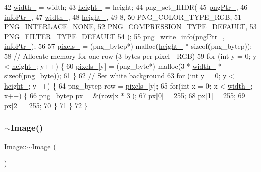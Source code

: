\begin{DoxyCode}
42     \mbox{\hyperlink{class_image_a4c2d8a01ecf1b7438f57f93357080e08}{width\_}} = width;
43     \mbox{\hyperlink{class_image_a64a699c5bb8e8a18c6971a8032806dba}{height\_}} = height;
44     png\_set\_IHDR(
45         \mbox{\hyperlink{class_image_aaf607d2596bac09b13370599d9ba6d8c}{pngPtr\_}}, 
46         \mbox{\hyperlink{class_image_a505878e5e19500e3cc1b940067faa584}{infoPtr\_}}, 
47         \mbox{\hyperlink{class_image_a4c2d8a01ecf1b7438f57f93357080e08}{width\_}}, 
48         \mbox{\hyperlink{class_image_a64a699c5bb8e8a18c6971a8032806dba}{height\_}}, 
49         8, 
50         PNG\_COLOR\_TYPE\_RGB, 
51         PNG\_INTERLACE\_NONE, 
52         PNG\_COMPRESSION\_TYPE\_DEFAULT, 
53         PNG\_FILTER\_TYPE\_DEFAULT
54     );
55     png\_write\_info(\mbox{\hyperlink{class_image_aaf607d2596bac09b13370599d9ba6d8c}{pngPtr\_}}, \mbox{\hyperlink{class_image_a505878e5e19500e3cc1b940067faa584}{infoPtr\_}});
56     
57     \mbox{\hyperlink{class_image_a51351c8507499d09cb9667c20ef01faf}{pixels\_}} = (png\_bytep*) malloc(\mbox{\hyperlink{class_image_a64a699c5bb8e8a18c6971a8032806dba}{height\_}} * \textcolor{keyword}{sizeof}(png\_bytep));
58     \textcolor{comment}{// Allocate memory for one row (3 bytes per pixel - RGB)}
59     \textcolor{keywordflow}{for} (\textcolor{keywordtype}{int} y = 0; y < \mbox{\hyperlink{class_image_a64a699c5bb8e8a18c6971a8032806dba}{height\_}}; y++) \{
60         \mbox{\hyperlink{class_image_a51351c8507499d09cb9667c20ef01faf}{pixels\_}}[y] = (png\_byte*) malloc(3 * \mbox{\hyperlink{class_image_a4c2d8a01ecf1b7438f57f93357080e08}{width\_}} * \textcolor{keyword}{sizeof}(png\_byte));
61     \}
62     \textcolor{comment}{// Set white background}
63     \textcolor{keywordflow}{for} (\textcolor{keywordtype}{int} y = 0; y < \mbox{\hyperlink{class_image_a64a699c5bb8e8a18c6971a8032806dba}{height\_}}; y++) \{
64         png\_bytep row = \mbox{\hyperlink{class_image_a51351c8507499d09cb9667c20ef01faf}{pixels\_}}[y];
65         \textcolor{keywordflow}{for}(\textcolor{keywordtype}{int} x = 0; x < \mbox{\hyperlink{class_image_a4c2d8a01ecf1b7438f57f93357080e08}{width\_}}; x++) \{
66             png\_bytep px = \&(row[x * 3]);
67             px[0] = 255;
68             px[1] = 255;
69             px[2] = 255;
70         \}
71     \}
72 \}
\end{DoxyCode}
\mbox{\label{class_image_a0294f63700543e11c0f0da85601c7ae5}} 
\subsubsection{\texorpdfstring{$\sim$\+Image()}{~Image()}}
{\footnotesize\ttfamily Image\+::$\sim$\+Image (\begin{DoxyParamCaption}{ }\end{DoxyParamCaption})}



